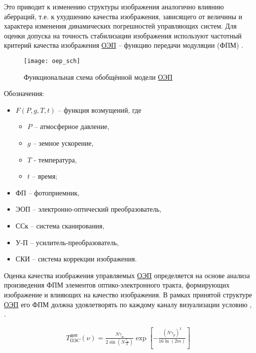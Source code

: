 Это приводит к изменению структуры изображения аналогично влиянию аберраций, т.е. к ухудшению качества изображения, зависящего от величины и характера изменения динамических погрешностей управляющих систем. Для оценки допуска на точность стабилизации изображения используют частотный критерий качества изображения \hyperref[acroEOS]{ОЭП} – функцию передачи модуляции (ФПМ) \cite[]{Tarasov}.

\begin{figure}[ht]
	\centering
	\texttt{[image: oep\_sch]} 
	\caption{Функциональная схема обобщённой модели \hyperref[acroEOS]{ОЭП}}
	\label{fig:oep_sch}
\end{figure}

Обозначения: 
\begin{itemize}
	\item $F(P,g,T,t)$ – функция возмущений, где
	\begin{itemize}
		\item $P$ – атмосферное давление,
		\item $g$ – земное ускорение,
		\item $T$ - температура, 
		\item $t$ – время;
	\end{itemize}
	\item ФП – фотоприемник, 
	\item ЭОП – электронно-оптический преобразователь, 
	\item ССк – система сканирования, 
	\item У-П – усилитель-преобразователь, 
	\item СКИ – система коррекции изображения.
\end{itemize}

Оценка качества изображения управляемых \hyperref[acroEOS]{ОЭП} определяется на основе анализа произведения ФПМ элементов оптико-электронного тракта, формирующих изображение и влияющих на качество изображения. В рамках принятой структуре \hyperref[acroEOS]{ОЭП} его ФПМ должна удовлетворять по каждому каналу визуализации условию \cite[]{Ivanov18}, \cite[]{Molin21}.

\begin{equation}
\label{eq:p2:3}
\begin{alignedat}{2}
T_{\textit{ОЭC}}^{\textit{доп}}\left(\nu{}\right)=
\frac{N{\gamma{}}_\textit{и}}{2\sin{\left(N\frac{{\gamma{}}_\textit{и}}{2}\right)}}
\exp{\left[-\frac{{\left(N{\gamma{}}_p\right)}^2}{16\ln{\left(2m\right)}}\right]}
\end{alignedat}
\end{equation}

